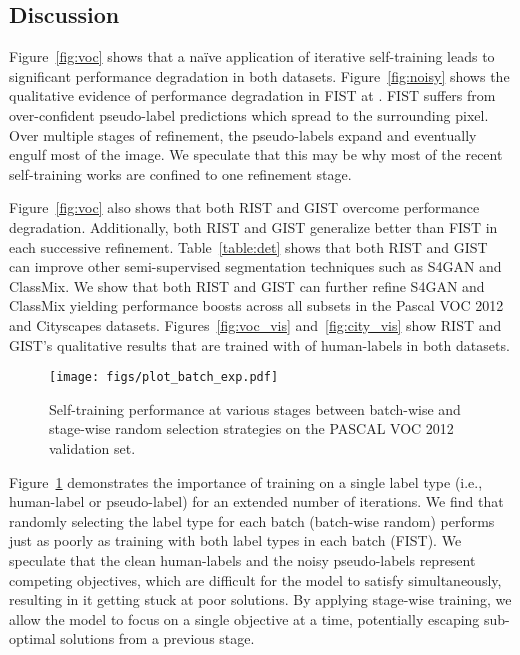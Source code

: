 \documentclass[10pt, conference, compsocconf]{IEEEtran}
\begin{document}
\subsection{Discussion}\label{sec:discussion}

Figure~\ref{fig:voc} shows that a na\"ive application of iterative self-training leads to significant performance degradation in both datasets. Figure~\ref{fig:noisy} shows the qualitative evidence of performance degradation in FIST at . FIST suffers from over-confident pseudo-label predictions which spread to the surrounding pixel. Over multiple stages of refinement, the pseudo-labels expand and eventually engulf most of the image. We speculate that this may be why most of the recent self-training works are confined to one refinement stage.

Figure~\ref{fig:voc} also shows that both RIST and GIST overcome performance degradation. Additionally, both RIST and GIST generalize better than FIST in each successive refinement.
Table~\ref{table:det} shows that both RIST and GIST can improve other semi-supervised segmentation techniques such as S4GAN and ClassMix. 
We show that both RIST and GIST can further refine S4GAN and ClassMix yielding performance boosts across all subsets in the Pascal VOC 2012 and Cityscapes datasets.
Figures~\ref{fig:voc_vis} and~\ref{fig:city_vis} show RIST and GIST's qualitative results that are trained with  of human-labels in both datasets. 


\begin{figure}[!htb]
  \centering
  \texttt{[image: figs/plot\_batch\_exp.pdf]}
  \caption{Self-training performance at various stages between batch-wise and stage-wise random selection strategies on the PASCAL VOC 2012 validation set.}
  \label{fig:batch}
\end{figure}

Figure~\ref{fig:batch} demonstrates the importance of training on a single label type (i.e., human-label or pseudo-label) for an extended number of iterations. We find that randomly selecting the label type for each batch (batch-wise random) performs just as poorly as training with both label types in each batch (FIST). We speculate that the clean human-labels and the noisy pseudo-labels represent competing objectives, which are difficult for the model to satisfy simultaneously, resulting in it getting stuck at poor solutions. By applying stage-wise training, we allow the model to focus on a single objective at a time, potentially escaping sub-optimal solutions from a previous stage.
\end{document}
